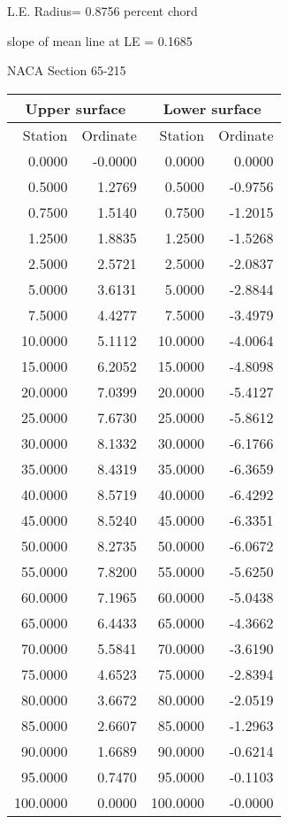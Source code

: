 \documentclass[11pt]{book}
\begin{document}
L.E. Radius=  0.8756 percent chord


 slope of mean line at LE =  0.1685
 \newpage
  \label{s65-215}
 \begin{Large}
 NACA Section 65-215
 \end{Large}
  
 \vspace{8mm}
 \begin{tabular}{|r|r|r|r|} \hline 
 \multicolumn{2}{|c|}{Upper surface} & \multicolumn{2}{|c|}{Lower surface} \\
 \hline
 Station & Ordinate & Station & Ordinate \\
 \hline
0.0000 & -0.0000 & 0.0000 & 0.0000 \\
0.5000 & 1.2769 & 0.5000 & -0.9756 \\
0.7500 & 1.5140 & 0.7500 & -1.2015 \\
1.2500 & 1.8835 & 1.2500 & -1.5268 \\
2.5000 & 2.5721 & 2.5000 & -2.0837 \\
5.0000 & 3.6131 & 5.0000 & -2.8844 \\
7.5000 & 4.4277 & 7.5000 & -3.4979 \\
10.0000 & 5.1112 & 10.0000 & -4.0064 \\
15.0000 & 6.2052 & 15.0000 & -4.8098 \\
20.0000 & 7.0399 & 20.0000 & -5.4127 \\
25.0000 & 7.6730 & 25.0000 & -5.8612 \\
30.0000 & 8.1332 & 30.0000 & -6.1766 \\
35.0000 & 8.4319 & 35.0000 & -6.3659 \\
40.0000 & 8.5719 & 40.0000 & -6.4292 \\
45.0000 & 8.5240 & 45.0000 & -6.3351 \\
50.0000 & 8.2735 & 50.0000 & -6.0672 \\
55.0000 & 7.8200 & 55.0000 & -5.6250 \\
60.0000 & 7.1965 & 60.0000 & -5.0438 \\
65.0000 & 6.4433 & 65.0000 & -4.3662 \\
70.0000 & 5.5841 & 70.0000 & -3.6190 \\
75.0000 & 4.6523 & 75.0000 & -2.8394 \\
80.0000 & 3.6672 & 80.0000 & -2.0519 \\
85.0000 & 2.6607 & 85.0000 & -1.2963 \\
90.0000 & 1.6689 & 90.0000 & -0.6214 \\
95.0000 & 0.7470 & 95.0000 & -0.1103 \\
100.0000 & 0.0000 & 100.0000 & -0.0000 \\
 \hline 
 \end{tabular}
\end{document}
